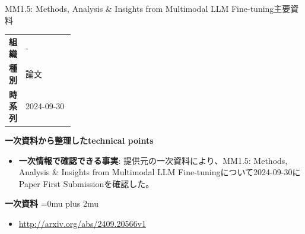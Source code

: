 \begin{technicalnote}{MM1.5: Methods, Analysis \& Insights from Multimodal LLM Fine-tuning}{主要資料}
\begingroup
\begin{tabularx}{\linewidth}{@{}>{\bfseries}p{0.22\linewidth}X@{}}
組織 & - \\
種別 & 論文 \\
時系列 & 2024-09-30 \\
\end{tabularx}
\smallskip
{\bfseries 一次資料から整理したtechnical points}
\begin{itemize}[leftmargin=1.5em,itemsep=0.35em]
\item \textbf{一次情報で確認できる事実}: 提供元の一次資料により、MM1.5: Methods, Analysis \& Insights from Multimodal LLM Fine-tuningについて2024-09-30にPaper First Submissionを確認した。
\end{itemize}
\begin{minipage}{\linewidth}
\begin{samepage}
{\bfseries 一次資料}
\begingroup\sloppy
\Urlmuskip=0mu plus 2mu\relax
\begin{itemize}[leftmargin=1.5em,itemsep=0.25em]
\item {\scriptsize\url{http://arxiv.org/abs/2409.20566v1}}
\end{itemize}
\endgroup
\end{samepage}
\end{minipage}
\endgroup
\end{technicalnote}
\medskip


